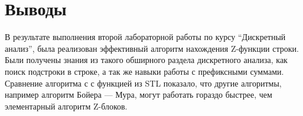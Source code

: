 \section{Выводы}
В результате выполнения второй лабораторной работы по курсу \enquote{Дискретный анализ}, была реализован эффективный
алгоритм нахождения Z-функции строки. Были получены знания из такого обширного раздела дискретного анализа, как поиск 
подстроки в строке, а так же навыки работы с префиксными суммами. Сравнение алгоритма с с функцией из STL показало, что
другие алгоритмы, например алгоритм Бойера — Мура, могут работать гораздо быстрее, чем элементарный алгоритм Z-блоков.
\pagebreak
